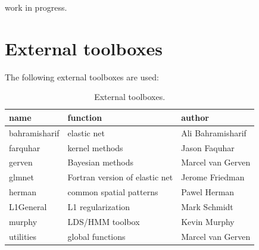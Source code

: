 \documentclass{article}
\begin{document}
work in progress.

\section{External toolboxes}

The following external toolboxes are used:

\begin{table}[ht]
\centering
\caption{External toolboxes.}
\begin{tabular}{l|l|l}
{\bf name} & {\bf function} & {\bf author}\\
\hline
bahramisharif & elastic net & Ali Bahramisharif  \\
farquhar & kernel methods & Jason Faquhar\\
gerven & Bayesian methods & Marcel van Gerven\\
glmnet & Fortran version of elastic net & Jerome Friedman\\
herman & common spatial patterns & Pawel Herman\\
L1General & L1 regularization & Mark Schmidt\\
murphy & LDS/HMM toolbox & Kevin Murphy\\
utilities & global functions & Marcel van Gerven
\end{tabular}
\label{measure}
\end{table}



\def\refname{}

\end{document}
